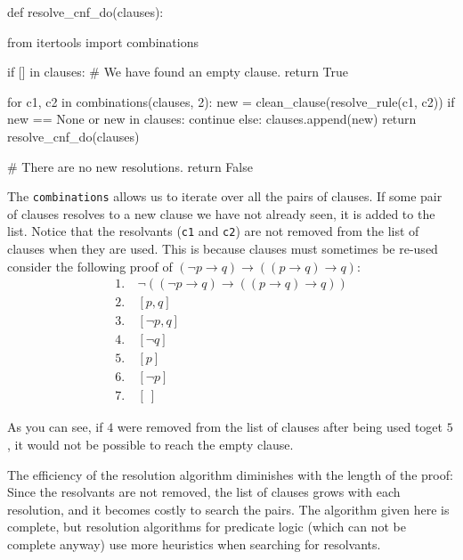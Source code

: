 \documentclass[a4paper,notitlepage]{scrartcl}
\begin{document}
\begin{code}

def resolve_cnf_do(clauses):

    from itertools import combinations

    if [] in clauses:
        # We have found an empty clause. 
        return True

    for c1, c2 in combinations(clauses, 2):
        new = clean_clause(resolve_rule(c1, c2))
        if new == None or new in clauses:
            continue
        else:
            clauses.append(new)
            return resolve_cnf_do(clauses)
    
    # There are no new resolutions.
    return False
\end{code}

The \texttt{combinations} allows us to iterate over all the pairs of 
   clauses.
If some pair of clauses resolves to a new clause we have not already
   seen, it is added to the list.
Notice that the resolvants (\texttt{c1} and \texttt{c2}) are not removed
   from the list of clauses when they are used.
This is because clauses must sometimes be re-used consider the following
   proof of $(\lnot p\rightarrow q)\rightarrow ((p\rightarrow q)\rightarrow
   q)$:
\begin{align*}
1.\ & \lnot((\lnot p\rightarrow q)\rightarrow ((p\rightarrow q)\rightarrow q))
   \tag{negated for resolution proof}\\
2.\ & [p, q] \tag{clausal cnf}\\
3.\ & [\lnot p, q] \tag{clausal cnf}\\
4.\ & [\lnot q]  \tag{clausal cnf}\\
5.\ & [p] \tag{resolution rule on 2, 4}\\
6.\ & [\lnot p] \tag{resolution rule on 3, 4}\\
7.\ & [\ ] \tag{resolution rule on 5, 6}
\end{align*}

As you can see, if $4$ were removed from the list of clauses after being
   used toget $5$, it would not be possible to reach the empty clause.

The efficiency of the resolution algorithm diminishes with the length
   of the proof: 
Since the resolvants are not removed, the list of clauses grows with
   each resolution, and it becomes costly to search the pairs.
The algorithm given here is complete, but resolution algorithms for
   predicate logic (which can not be complete anyway)
   use more heuristics when searching for resolvants.
\end{document}
